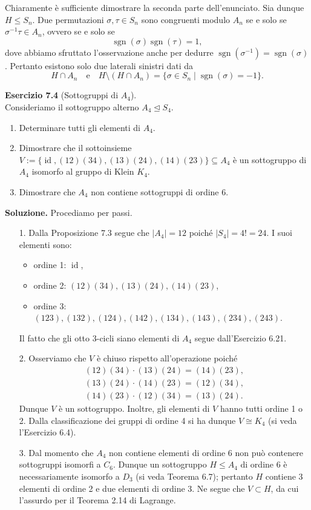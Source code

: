 \documentclass[12px]{article}
\begin{document}
\begin{dimo}
Chiaramente è sufficiente dimostrare la seconda parte dell'enunciato. Sia dunque $H \leq S_n$.
Due permutazioni $\sigma, \tau \in S_n$ sono congruenti modulo $A_n$ se e solo se $\sigma^{-1}\tau \in A_n$,
ovvero se e solo se
\[
\operatorname{sgn}(\sigma)\operatorname{sgn}(\tau) = 1,
\]
dove abbiamo sfruttato l'osservazione anche per dedurre $\operatorname{sgn}(\sigma^{-1}) = \operatorname{sgn}(\sigma)$.
Pertanto esistono solo due laterali sinistri dati da
\[
H \cap A_n \quad \text{e} \quad H \setminus (H \cap A_n) = \{\sigma \in S_n \mid \operatorname{sgn}(\sigma) = -1\}.
\]
\end{dimo}
\textbf{Esercizio 7.4} (Sottogruppi di $A_4$).\\ Consideriamo il sottogruppo alterno $A_4 \trianglelefteq S_4$.
\begin{enumerate}
    \item Determinare tutti gli elementi di $A_4$.
    \item Dimostrare che il sottoinsieme $V := \{\operatorname{id}, (12)(34), (13)(24), (14)(23)\} \subseteq A_4$ è un sottogruppo di $A_4$ isomorfo al gruppo di Klein $K_4$.
    \item Dimostrare che $A_4$ non contiene sottogruppi di ordine 6.
\end{enumerate}
\textbf{Soluzione.} Procediamo per passi.
\begin{enumerate}
    \item[1.] Dalla Proposizione 7.3 segue che $\lvert A_4 \rvert = 12$ poiché $\lvert S_4 \rvert = 4! = 24$. I suoi elementi sono:
    \begin{itemize}
        \item ordine 1: $\operatorname{id}$,
        \item ordine 2: $(12)(34), (13)(24), (14)(23)$,
        \item ordine 3: $(123), (132), (124), (142), (134), (143), (234), (243)$.
    \end{itemize}
    Il fatto che gli otto 3-cicli siano elementi di $A_4$ segue dall'Esercizio 6.21.

    \item[2.] Osserviamo che $V$ è chiuso rispetto all'operazione poiché
	    \begin{gather*}
    (12)(34) \cdot (13)(24) = (14)(23), \\
    (13)(24) \cdot (14)(23) = (12)(34),\\
    (14)(23) \cdot (12)(34) = (13)(24).
    \end{gather*}
    Dunque $V$ è un sottogruppo. Inoltre, gli elementi di $V$ hanno tutti ordine 1 o 2. Dalla classificazione dei gruppi di ordine 4 si ha dunque $V \cong K_4$ (si veda l'Esercizio 6.4).

    \item[3.] Dal momento che $A_4$ non contiene elementi di ordine 6 non può contenere sottogruppi isomorfi a $C_6$. Dunque un sottogruppo $H \leq A_4$ di ordine 6 è necessariamente isomorfo a $D_3$ (si veda Teorema 6.7); pertanto $H$ contiene 3 elementi di ordine 2 e due elementi di ordine 3. Ne segue che $V \subset H$, da cui l'assurdo per il Teorema 2.14 di Lagrange.
\end{enumerate}
\end{document}
